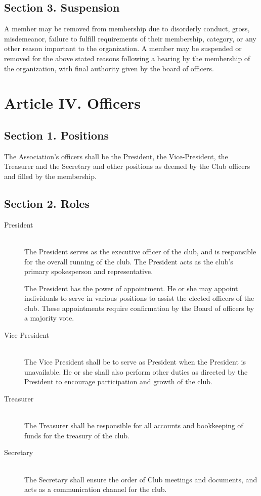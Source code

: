 \documentclass{article}
\begin{document}
  \subsection{Section 3. Suspension}
    A member may be removed from membership due to disorderly conduct, gross, misdemeanor, failure to fulfill requirements of their membership, category, or any other reason important to the organization. A member may be suspended or removed for the above stated reasons following a hearing by the membership of the organization, with final authority given by the board of officers.

\section{Article IV. Officers}

  \subsection{Section 1. Positions}
    The Association’s officers shall be the President, the Vice-President, the Treasurer and the Secretary and other positions as deemed by the Club officers and filled by the membership.

  \subsection{Section 2. Roles}
    \begin{description}
      \item[President] ~\\
        The President serves as the executive officer of the club, and is responsible for the overall running of the club. The President acts as the club's primary spokesperson and representative.

        The President has the power of appointment. He or she may appoint individuals to serve in various positions to assist the elected officers of the club. These appointments require confirmation by the Board of officers by a majority vote.

      \item[Vice President] ~\\
        The Vice President shall be to serve as President when the President is unavailable. He or she shall also perform other duties as directed by the President to encourage participation and growth of the club.

      \item[Treasurer] ~\\
        The Treasurer shall be responsible for all accounts and bookkeeping of funds for the treasury of the club.

      \item[Secretary] ~\\
        The Secretary shall ensure the order of Club meetings and documents, and acts as a communication channel for the club.
    \end{description}
\end{document}
